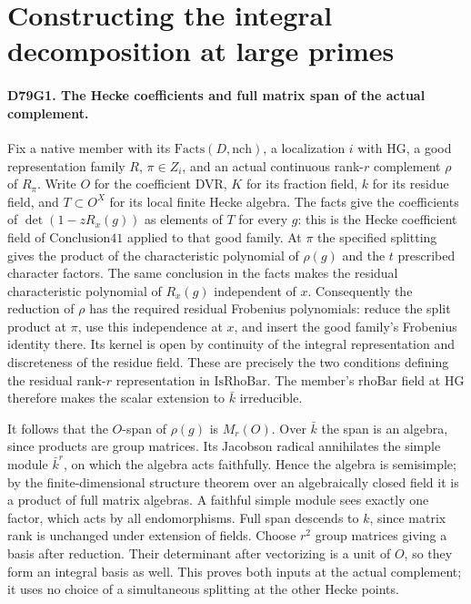 \section{Constructing the integral decomposition at large primes}

\paragraph{D79G1. The Hecke coefficients and full matrix span of the actual complement.}
Fix a native member with its $\mathrm{Facts}(D,\mathrm{nch})$, a
localization $i$ with $\mathrm{HG}$, a good representation family
$R$, $\pi\in Z_i$, and an actual continuous rank-$r$ complement
$\rho$ of $R_\pi$. Write $O$ for the coefficient DVR, $K$ for
its fraction field, $k$ for its residue field, and $T\subset O^X$
for its local finite Hecke algebra. The facts give the coefficients of
$\det(1-z R_x(g))$ as elements of $T$ for every $g$: this is the
Hecke coefficient field of $\mathrm{Conclusion41}$ applied to
that good family. At $\pi$ the specified splitting gives the product
of the characteristic polynomial of $\rho(g)$ and the $t$ prescribed
character factors. The same conclusion in the facts makes the
residual characteristic polynomial of $R_x(g)$ independent of $x$.
Consequently the reduction of $\rho$ has the required residual
Frobenius polynomials: reduce the split product at $\pi$, use this
independence at $x$, and insert the good family's Frobenius identity
there. Its kernel is open by continuity of the integral representation
and discreteness of the residue field. These are precisely the two
conditions defining the residual rank-$r$ representation in
$\mathrm{IsRhoBar}$. The member's $\mathrm{rhoBar}$ field at
$\mathrm{HG}$ therefore makes the scalar extension to $\bar k$
irreducible.

It follows that the $O$-span of $\rho(g)$ is $M_r(O)$.
Over $\bar k$ the span is an algebra, since products are group
matrices. Its Jacobson radical annihilates the simple module
$\bar k^r$, on which the algebra acts faithfully. Hence the algebra
is semisimple; by the finite-dimensional structure theorem over an
algebraically closed field it is a product of full matrix algebras.
A faithful simple module sees exactly one factor, which acts by
all endomorphisms. Full span descends to $k$, since matrix rank
is unchanged under extension of fields. Choose $r^2$ group matrices
giving a basis after reduction. Their determinant after vectorizing
is a unit of $O$, so they form an integral basis as well. This proves
both inputs at the actual complement; it uses no choice of a
simultaneous splitting at the other Hecke points.

